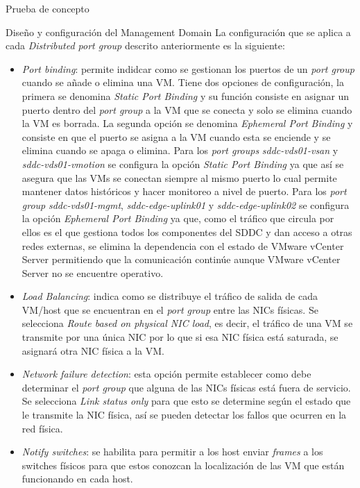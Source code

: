 \begin{section}{Prueba de concepto}
\begin{subsection}{Diseño y configuración del Management Domain}
    La configuración que se aplica a cada \textit{Distributed port group} descrito anteriormente es la siguiente:
    \begin{itemize}
      \item \textit{Port binding}: permite indidcar como se gestionan los puertos de un \textit{port group} cuando se añade o elimina una VM. Tiene dos opciones de configuración, la primera se denomina \textit{Static Port Binding} y su función consiste en asignar un puerto dentro del \textit{port group} a la VM que se conecta y solo se elimina cuando la VM es borrada. La segunda opción se denomina \textit{Ephemeral Port Binding} y consiste en que el puerto se asigna a la VM cuando esta se enciende y se elimina cuando se apaga o elimina. Para los \textit{port groups} \textit{sddc-vds01-vsan} y \textit{sddc-vds01-vmotion} se configura la opción \textit{Static Port Binding} ya que así se asegura que las VMs se conectan siempre al mismo puerto lo cual permite mantener datos históricos y hacer monitoreo a nivel de puerto. Para los \textit{port group} \textit{sddc-vds01-mgmt}, \textit{sddc-edge-uplink01} y \textit{sddc-edge-uplink02} se configura la opción \textit{Ephemeral Port Binding} ya que, como el tráfico que circula por ellos es el que gestiona todos los componentes del SDDC y dan acceso a otras redes externas, se elimina la dependencia con el estado de VMware vCenter Server permitiendo que la comunicación continúe aunque VMware vCenter Server no se encuentre operativo.
    
      \item \textit{Load Balancing}: indica como se distribuye el tráfico de salida de cada VM/host que se encuentran en el \textit{port group} entre las NICs físicas. Se selecciona \textit{Route based on physical NIC load}, es decir, el tráfico de una VM se transmite por una única NIC por lo que si esa NIC física está saturada, se asignará otra NIC física a la VM.
      
      \item \textit{Network failure detection}: esta opción permite establecer como debe determinar el \textit{port group} que alguna de las NICs físicas está fuera de servicio. Se selecciona \textit{Link status only} para que esto se determine según el estado que le transmite la NIC física, así se pueden detectar los fallos que ocurren en la red física.
      
      \item \textit{Notify switches}: se habilita para permitir a los host enviar \textit{frames} a los switches físicos para que estos conozcan la localización de las VM que están funcionando en cada host.
      

\end{itemize}
\end{subsection}
\end{section}
